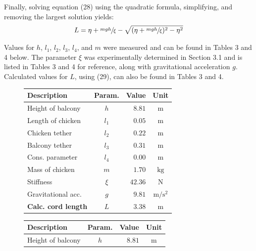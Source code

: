 \documentclass[a4paper]{article}
\begin{document}
Finally, solving equation (28) using the quadratic formula, simplifying, and removing the largest solution yields:
\begin{equation}
L = \eta +\sfrac{mgh}{\xi} - \sqrt{(\eta + \sfrac{mgh}{\xi})^2 - \eta^2}
\end{equation}

Values for $h$, $l_1$, $l_2$, $l_3$, $l_4$, and $m$ were measured and can be found in Tables 3 and 4 below. The parameter $\xi$ was experimentally determined in Section 3.1 and is listed in Tables 3 and 4 for reference, along with gravitational acceleration $g$. Calculated values for $L$, using (29), can also be found in Tables 3 and 4.\\
\begin{figure}
	\centering
	\begin{minipage}[t]{0.45\textwidth}
		\centering
		\small
		\begin{tabular}{lcrc}
			\toprule
			Description & Param. & Value & Unit\\
			\midrule
			Height of balcony & $h$ & $8.81$ & $\si{\meter}$ \\
			Length of chicken & $l_1$ & $0.05$ & $\si{\meter}$ \\
			Chicken tether & $l_2$ & $0.22$ & $\si{\meter}$ \\
			Balcony tether & $l_3$ & $0.31$ & $\si{\meter}$ \\
			Cons. parameter & $l_4$ & $0.00$ & $\si{\meter}$ \\
			Mass of chicken & $m$ & $1.70$ & $\si{\kilogram}$ \\
			Stiffness & $\xi$ & $42.36$ & $\si{\newton}$ \\
			Gravitational acc. & $g$ & $9.81$ & $\si{\meter\per\second^2}$ \\
			\midrule
			\textbf{Calc. cord length} & $L$ & $3.38$ & $\si{\meter}$\\
			\bottomrule
		\end{tabular}
	\end{minipage}
	\hspace{0.75cm}
	\begin{minipage}[t]{0.45\textwidth}
		\centering
		\small
		\begin{tabular}{lcrc}
			\toprule
			Description & Param. & Value & Unit\\
			\midrule
			Height of balcony & $h$ & $8.81$ & $\si{\meter}$ \\

\end{tabular}
\end{minipage}
\end{figure}
\end{document}
